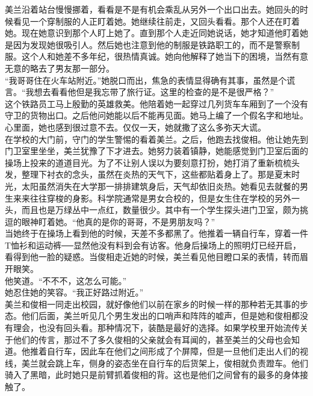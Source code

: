 美兰沿着站台慢慢挪着，看看是不是有机会乘乱从另外一个出口出去。她回头的时候看见一个穿制服的人正盯着她。她继续往前走，又回头看看。那个人还在盯着她。现在她意识到那个人盯上她了。直到那个人走近同她说话，她才知道他盯着她是因为发现她很吸引人。然后她也注意到他的制服是铁路职工的，而不是警察制服。这个人和她差不多年纪，很热情真诚。她向他解释了她当下的困境，当然有意无意的略去了男友那一部分。\\

“我哥哥住在火车站附近。”她脱口而出，焦急的表情显得确有其事，虽然是个谎言。“我想去看看他但是我忘带了旅行证。这里的检查的是不是很严格？”\\

这个铁路员工马上殷勤的英雄救美。他陪着她一起穿过几列货车车厢到了一个没有守卫的货物出口。之后他问她能以后不能再见面。她马上编了一个假名字和地址。心里面，她也感到很过意不去。仅仅一天，她就撒了这么多弥天大谎。\\

在学校的大门前，守门的学生警惕的看着美兰。之后，他跑去找俊相。他让她先到门卫室里坐坐，美兰犹豫了下才进去。她努力装着镇静，她能感觉到门卫室后面的操场上投来的道道目光。为了不让别人误以为要刻意打扮，她打消了重新梳梳头发，整理下衬衣的念头，虽然在炎热的天气下，这些都贴着身上了。那是夏末时光，太阳虽然消失在大学那一排排建筑身后，天气却依旧炎热。她看见去就餐的男生来来往往穿梭的身影。科学院通常是男女合校的，但是女生住在学校的另外一头，而且也是万绿丛中一点红，数量很少。其中有一个学生探头进门卫室，颇为挑逗的眼神盯着她。“他真的是你的哥哥，不是男朋友吗？”\\

当她终于在操场上看到他的时候，天差不多都黑了。他推着一辆自行车，穿着一件T恤衫和运动裤──显然他没有料到会有访客。他身后操场上的照明灯已经开启，看得到他一脸的疑惑。当俊相走近她的时候，美兰看见他目瞪口呆的表情，转而眉开眼笑。\\

他笑道。“不不不，这怎么可能。”\\

她忍住她的笑容。“我正好路过附近。”\\

美兰和俊相一同走出校园，就好像他们以前在家乡的时候一样的那种若无其事的步态。他们后面，美兰听见几个男生发出的口哨声和阵阵的嘘声，但是她和俊相都没有理会，也没有回头看。那种情况下，装酷是最好的选择。如果学校里开始流传关于他们的传言，那过不了多久俊相的父亲就会有耳闻的，甚至美兰的父母也会知道。他推着自行车，因此车在他们之间形成了个屏障，但是一旦他们走出人们的视线，美兰就会跳上车，侧身的姿态坐在自行车的后货架上，俊相就负责蹬车。他们骑入了黑暗，此时她只是前臂抓着俊相的背。这也是他们之间曾有的最多的身体接触了。\\

